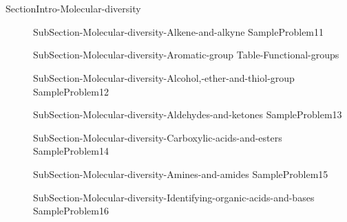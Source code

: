 \documentclass[main.tex]{subfiles}
\newcommand\chapterlabel{Ch-orgo}\setcounter{figurenewcounter}{0}\setcounter{tablenewcounter}{0}\setcounter{formulanewcounter}{0}
\begin{document}
\section{\color{blue!30!black}{Molecular diversity}}
 {SectionIntro-Molecular-diversity}\sloppy
\begin{description}
\item[]{SubSection-Molecular-diversity-Alkene-and-alkyne}
{SampleProblem11}
 \item[]{SubSection-Molecular-diversity-Aromatic-group}
 {Table-Functional-groups}
\item[]{SubSection-Molecular-diversity-Alcohol,-ether-and-thiol-group}
{SampleProblem12}
\item[] {SubSection-Molecular-diversity-Aldehydes-and-ketones}
{SampleProblem13}
\item[]{SubSection-Molecular-diversity-Carboxylic-acids-and-esters}
{SampleProblem14}
 \item[] {SubSection-Molecular-diversity-Amines-and-amides}
{SampleProblem15}
\item[]{SubSection-Molecular-diversity-Identifying-organic-acids-and-bases}
{SampleProblem16}
 \end{description}



\clearpage\thispagestyle{empty}\mbox{}\clearpage
\end{document}
